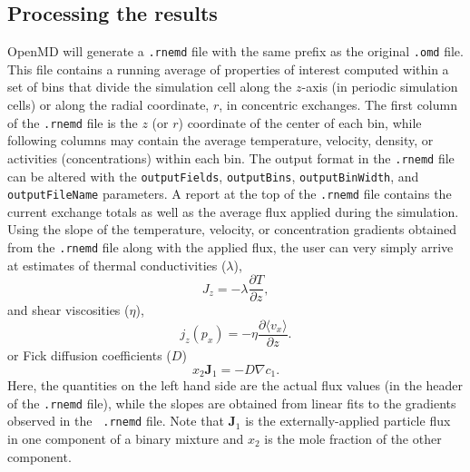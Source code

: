 \documentclass[letterpaper]{report}
\begin{document}
\subsection{\label{section:rnemdResults} Processing the results} 
OpenMD will generate a {\tt .rnemd} file with the same prefix as the
original {\tt .omd} file.  This file contains a running average of
properties of interest computed within a set of bins that divide the
simulation cell along the $z$-axis (in periodic simulation cells) or
along the radial coordinate, $r$, in concentric exchanges.  The first
column of the {\tt .rnemd} file is the $z$ (or $r$) coordinate of the
center of each bin, while following columns may contain the average
temperature, velocity, density, or activities (concentrations) within
each bin. The output format in the {\tt .rnemd} file can be altered
with the {\tt outputFields}, {\tt outputBins}, {\tt outputBinWidth}, and {\tt
  outputFileName} parameters.  A report at the top of the {\tt .rnemd}
file contains the current exchange totals as well as the average flux
applied during the simulation.  Using the slope of the temperature, velocity, or
concentration gradients obtained from the {\tt .rnemd} file along with the
applied flux, the user can very simply arrive at estimates of thermal
conductivities ($\lambda$),
\begin{equation}
J_z = -\lambda \frac{\partial T}{\partial z},
\end{equation}
and shear viscosities ($\eta$),
\begin{equation}
j_z(p_x) = -\eta \frac{\partial \langle v_x \rangle}{\partial z}.
\end{equation}
or Fick diffusion coefficients ($D$)
\begin{equation}
   x_2 \mathbf{J}_1 = - D \nabla c_1. \label{eq:spfDiffusion}
\end{equation}
Here, the quantities on the left hand side are the actual flux values
(in the header of the {\tt .rnemd} file), while the slopes are
obtained from linear fits to the gradients observed in the {\tt
  .rnemd} file.  Note that $\mathbf{J}_1$ is the externally-applied
particle flux in one component of a binary mixture and $x_2$ is the
mole fraction of the other component.
\end{document}
